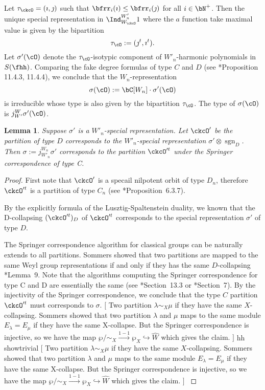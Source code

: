 \documentclass[12pt,a4paper]{amsart}
\newcommand{\trivial}[2][]{\if\relax\detokenize{#1}\relax
  {%
      \color{orange} \vspace{0em} $[$  #2 $]$
      \color{black}
  }
  \else
\ifx#1h
\ifcsname showtrivial\endcsname
{%
    \color{orange} \vspace{0em}  $[$ #2 $]$
    \color{black}
}
\fi
\else {\red Wrong argument!} \fi
\fi
}
\newcommand{\sgn}{\operatorname{sgn}}
\numberwithin{equation}{section}
\newtheorem{lem}[thm]{Lemma}
\theoremstyle{remark}
\def\sP{\wp}
\begin{document}
Let $\tau_\ckcO  = (\imath,\jmath)$ such that $\bfrr_i(\imath)\leq \bfrr_i(\jmath)$ for all $i\in \bN^+$.
Then the unique special representation
in $\Ind_{W_\ckcO}^{W'_n} 1$ where the $a$ function take maximal value is given
by the bipartition
\[
  \tau_{\cO}:=(\jmath^t,\imath^t).
\]
Let $\sigma'(\cO)$ denote the $\tau_{\cO}$-isotypic component of $W'_n$-harmonic polynomials in $S(\fhh)$.
Comparing the  fake degree formulas of type $C$ and $D$ (see \cite{Carter}*{Proposition 11.4.3, 11.4.4}), we conclude that
the $W_n$-representation
\begin{equation}\label{eq:sigma.tC}
\sigma(\cO):= \bC[W_n]\cdot \sigma'(\cO)
\end{equation}
is irreducible whose type is also given by the
bipartition $\tau_{\cO}$. The type of $\sigma(\cO)$ is $j_{W'}^{W} \sigma'(\cO)$.

\begin{lem}\label{lem:MD1}
  Suppose $\sigma'$ is a $W'_n$-special representation.%
  Let $\ckcO'$ be the partition of type $D$ corresponds to the $W'_n$-special representation
  $\sigma'\otimes \sgn_D$. Then $\sigma:=j_{W'_n}^{W_n} \sigma'$ corresponds to the partition $\ckcO'^t$ under the Springer correspondence of
  type C.
\end{lem}
\begin{proof}
  First note that $\ckcO'$ is a specail nilpotent orbit of type $D_n$,
  therefore $\ckcO'^t$ is a partition of type $C_n$ (see \cite{CM}*{Proposition~6.3.7}).

  By the explicitly formula of the Lusztig-Spaltenstein duality, we known that the D-collapsing
  $(\ckcO'^t)_D$ of $\ckcO'^t$ corresponds to the special representation
  $\sigma'$ of type $D$.

  The Springer correspondence algorithm for classical groups can be naturally extends to all partitions.
  Sommers showed that two partitions are mapped to the same Weyl group representations
  if and only if they has the same $D$-collapsing \cite{So}*{Lemma~9}.
  Note that the algorithms computing the Springer correspondence for type C and D are essentially the same
  (see \cite{Carter}*{Section~13.3} or \cite{So}*{Section~7}).
  By the injectivity of the Springer correspondence, we conclude that the type $C$ partition $\ckcO'^t$
  must corresponds to $\sigma$.
  \trivial[h]{
    Two partition $\lambda\sim_X \mu$ if they have the same $X$-collapsing.
  Sommers showed that two partition $\lambda$ and $\mu$ maps to the same module $E_\lambda = E_\mu$
  if they have the same X-collapse. But the Springer correspondence is injective,
  so we have the map $\sP/\sim_X \xrightarrow{1-1} \sP_X \hookrightarrow \widehat{W}$
  which gives the claim.
  }
\end{proof}
\end{document}
